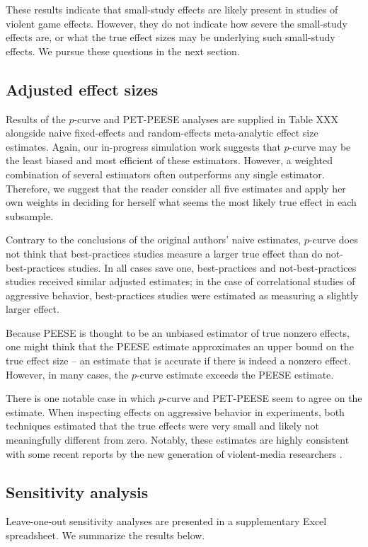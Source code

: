 \documentclass[man]{apa6}
\begin{document}
These results indicate that small-study effects are likely present in studies of violent game effects. However, they do not indicate how severe the small-study effects are, or what the true effect sizes may be underlying such small-study effects. We pursue these questions in the next section.

\subsection{Adjusted effect sizes}
Results of the $p$-curve and PET-PEESE analyses are supplied in Table XXX alongside naive fixed-effects and random-effects meta-analytic effect size estimates. Again, our in-progress simulation work suggests that $p$-curve may be the least biased and most efficient of these estimators. However, a weighted combination of several estimators often outperforms any single estimator. Therefore, we suggest that the reader consider all five estimates and apply her own weights in deciding for herself what seems the most likely true effect in each subsample.

Contrary to the conclusions of the original authors' naive estimates, $p$-curve does not think that best-practices studies measure a larger true effect than do not-best-practices studies. In all cases save one, best-practices and not-best-practices studies received similar adjusted estimates; in the case of correlational studies of aggressive behavior, best-practices studies were estimated as measuring a slightly larger effect. 

Because PEESE is thought to be an unbiased estimator of true nonzero effects, one might think that the PEESE estimate approximates an upper bound on the true effect size -- an estimate that is accurate if there is indeed a nonzero effect. However, in many cases, the $p$-curve estimate exceeds the PEESE estimate. 

There is one notable case in which $p$-curve and PET-PEESE seem to agree on the estimate. When inspecting effects on aggressive behavior in experiments, both techniques estimated that the true effects were very small and likely not meaningfully different from zero. Notably, these estimates are highly consistent with some recent reports by the new generation of violent-media researchers \citep{Engelhardt:etal:2015,Przybylski:etal:2014}.

\subsection{Sensitivity analysis}
Leave-one-out sensitivity analyses are presented in a supplementary Excel spreadsheet. We summarize the results below.
\end{document}
